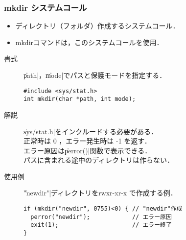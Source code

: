 \documentclass{beamer}                 %
\begin{document}
\begin{frame}[fragile]
  \frametitle{mkdir システムコール}
  \begin{itemize}
  \item ディレクトリ（フォルダ）作成するシステムコール．
  \item mkdirコマンドは，このシステムコールを使用．
  \end{itemize}

  \begin{description}
  \item[書式] \|path|，\|mode|でパスと保護モードを指定する．
\begin{verbatim}
#include <sys/stat.h>
int mkdir(char *path, int mode);
\end{verbatim}

  \item[解説] \|sys/stat.h|をインクルードする必要がある．\\
    正常時は 0 ，エラー発生時は -1 を返す．\\
    エラー原因は\|perror()|関数で表示できる．\\
    パスに含まれる途中のディレクトリは作らない．

  \item[使用例] \|"newdir"|ディレクトリをrwxr-xr-x で作成する例．
\begin{verbatim}
if (mkdir("newdir", 0755)<0) { // "newdir"作成
  perror("newdir");            // エラー原因
  exit(1);                     // エラー終了
}
\end{verbatim}

  \end{description}
\end{frame}
\end{document}
